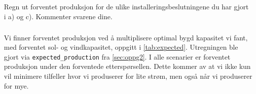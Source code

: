 \documentclass{article}
\begin{document}
\subsection{}
Regn ut forventet produksjon for de ulike installeringsbeslutningene du har gjort i a) og c).
Kommenter svarene dine.

\subsubsection{}
Vi finner forventet produksjon ved å multiplisere optimal bygd kapasitet vi fant, med forventet sol- og vindkapasitet, oppgitt i \autoref{tab:expected}.
Utregningen ble gjort via \verb|expected_production| fra \autoref{sec:oppg2}.
I alle scenarier er forventet produksjon under den forventede etterspørsellen.
Dette kommer av at vi ikke kun vil minimere tilfeller hvor vi produserer for lite strøm, men også når vi produserer for mye.

\begin{table}[h]
\centering
{}
\qquad
{}
\caption{Forventet produksjon for de ulike installeringsbeslutningene, per teknologi.}
\label{tab:expected}
\end{table}
\end{document}

